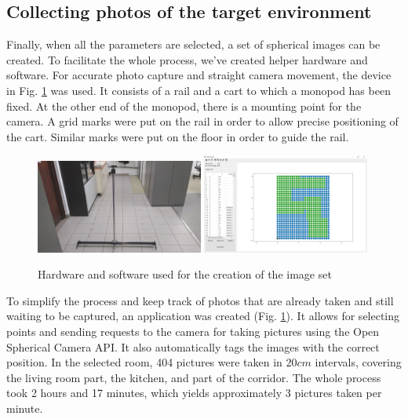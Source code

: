\documentclass{svproc}
\begin{document}
\subsection{Collecting photos of the target environment}

Finally, when all the parameters are selected, a set of spherical images can be created.
To facilitate the whole process, we've created helper hardware and software.
For accurate photo capture and straight camera movement, the device in Fig. \ref{fig:rig} was used.
It consists of a rail and a cart to which a monopod has been fixed.
At the other end of the monopod, there is a mounting point for the camera.
A grid marks were put on the rail in order to allow precise positioning of the cart.
Similar marks were put on the floor in order to guide the rail.


\begin{figure}[!ht]
    \centering
    \includegraphics[width=0.49\textwidth]{img/rig/calosc.jpg}\hfill%
    \includegraphics[width=0.49\textwidth]{img/creator.png}\\
    \caption{Hardware and software used for the creation of the image set}
    \label{fig:rig}
\end{figure}

To simplify the process and keep track of photos that are already taken and still waiting to 
be captured, an application was created (Fig. \ref{fig:rig}).
It allows for selecting points and sending requests to the camera for taking pictures using the
Open Spherical Camera API. It also automatically tags the images with the correct position.
In the selected room, 404 pictures were taken in $20 cm$ intervals, covering the living room part,
the kitchen, and part of the corridor. The whole process took 2 hours and 17 minutes,
which yields approximately 3 pictures taken per minute. 
\end{document}

